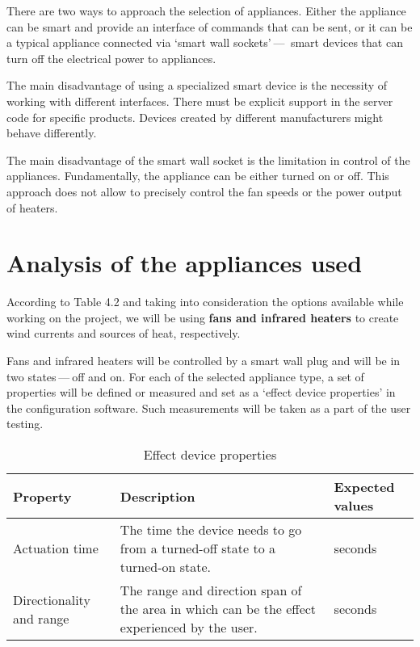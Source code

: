 There are two ways to approach the selection of appliances. Either the
appliance can be smart and provide an interface of commands that can be sent, or
it can be a typical appliance connected via `smart wall sockets' — 
smart devices that can turn off the electrical power to appliances.

The main disadvantage of using a specialized smart device is the necessity of
working with different interfaces. There must be explicit
support in the server code for specific products. Devices created by different
manufacturers might behave differently.

The main disadvantage of the smart wall socket is the limitation in
control of the appliances. Fundamentally, the appliance can be either turned on or off.
This approach does not allow to precisely control the fan speeds or the power output
of heaters.

\section{Analysis of the appliances used}\label{analysis:appliances}
According to Table 4.2 and taking into consideration the
options available while working on the project, we will be using \textbf{fans
and infrared heaters}
to create wind currents and sources of heat, respectively.

Fans and infrared heaters will be controlled by a smart wall plug
and will be in two states — off and on. For each of the selected appliance
type, a set of properties will be defined
or measured and set as a `effect device properties' in the configuration
software. Such measurements will be taken as a part of the user testing.

\begin{table}[H]
\centering
\begin{tabular}{|p{6em}|p{20em}|p{6em}|}
\hline
\textbf{Property}        & \textbf{Description}                                                                         & \textbf{Expected values} \\ \hline
Actuation time           & The time the device needs to go from a turned-off state to a turned-on state.                & seconds                  \\ \hline
Directionality and range & The range and direction span of the area in which can be the effect experienced by the user. & seconds                  \\ \hline
\end{tabular}
\caption{Effect device properties}
\end{table}

